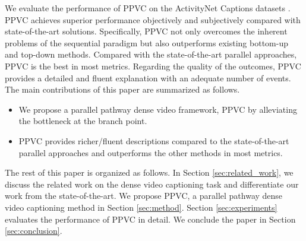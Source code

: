 We evaluate the performance of PPVC on the ActivityNet Captions datasets \cite{krishna2017dense}.
PPVC achieves superior performance objectively and subjectively compared with state-of-the-art solutions.
Specifically, PPVC not only overcomes the inherent problems of the sequential paradigm but also outperforms existing bottom-up and top-down methods.
Compared with the state-of-the-art parallel approaches, PPVC is the best in most metrics.
Regarding the quality of the outcomes, PPVC provides a detailed and fluent explanation with an adequate number of events.
The main contributions of this paper are summarized as follows.
\begin{itemize}
  \item We propose a parallel pathway dense video framework, PPVC by alleviating the bottleneck at the branch point.
  \item PPVC provides richer/fluent descriptions compared to the state-of-the-art parallel approaches and outperforms the other methods in most metrics.
\end{itemize}

The rest of this paper is organized as follows.
In Section \ref{sec:related_work}, we discuss the related work on the dense video captioning task and differentiate our work from the state-of-the-art.
We propose PPVC, a parallel pathway dense video captioning method in Section \ref{sec:method}.
Section \ref{sec:experiments} evaluates the performance of PPVC in detail.
We conclude the paper in Section \ref{sec:conclusion}.

